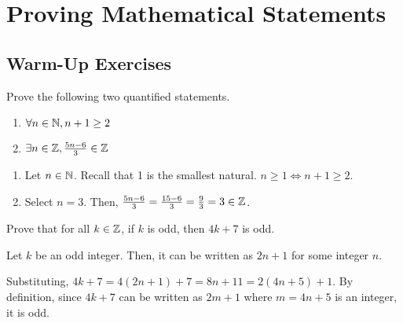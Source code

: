 \chapter{Proving Mathematical Statements}

\section{Warm-Up Exercises}
\begin{warmup}
  Prove the following two quantified statements.
  \begin{enumerate}
    \item $\forall n \in \mathbb{N}, n+1 \geq 2$
    \item $\exists n \in \mathbb{Z}, \frac{5n-6}{3} \in \mathbb{Z}$
  \end{enumerate}
\end{warmup}
\begin{prf}
  \begin{enumerate}
    \item Let $n \in \mathbb{N}$.
          Recall that 1 is the smallest natural.
          $n \geq 1 \iff n+1 \geq 2$.

    \item Select $n=3$. Then, $\frac{5n-6}{3}=\frac{15-6}{3}=\frac{9}{3}=3 \in \mathbb{Z}$.
          \qedhere
  \end{enumerate}
\end{prf}

\begin{warmup}
  Prove that for all $k \in \mathbb{Z}$, if $k$ is odd, then $4k + 7$ is odd.
\end{warmup}
\begin{prf}
  Let $k$ be an odd integer.
  Then, it can be written as $2n+1$ for some integer $n$.

  Substituting, $4k+7 = 4(2n+1) + 7 = 8n+11 =2(4n+5)+1$.
  By definition, since $4k+7$ can be written as $2m+1$ where $m=4n+5$ is an integer, it is odd.
\end{prf}

